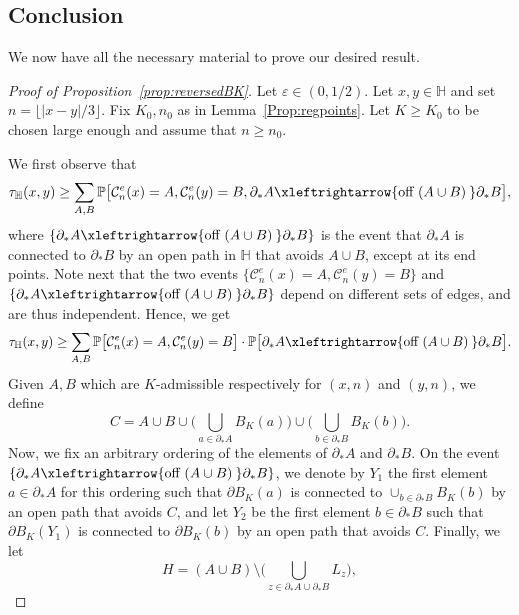 \documentclass[11pt,a4paper]{article}
\numberwithin{equation}{section}
\theoremstyle{plain}
\theoremstyle{definition}
\newcommand{\connect}{\xleftrightarrow}
\begin{document}
\subsection{Conclusion}\label{sec:conclusion}
We now have all the necessary material to prove our desired result. 

\begin{proof}[Proof of Proposition~\textup{\ref{prop:reversedBK}}] 
Let $\varepsilon\in (0,1/2)$. Let $x,y\in \mathbb H$ and set $n = \lfloor |x- y|/3\rfloor$. Fix $K_0,n_0$ as in Lemma~\ref{Prop:regpoints}. Let $K\geq K_0$ to be chosen large enough and assume that $n\ge n_0$.  

We first observe that 
\begin{equation}
	\tau_{\mathbb H}(x,y) \ge \sum_{A,B} \mathbb P\big[\mathcal C_n^e(x) = A, \mathcal C_n^e(y) = B, \partial_*A\connect{\textrm{off } (A\cup B)\:} \partial_*B\big],
\end{equation}
where $\{\partial_*A\connect{\textrm{off } (A\cup B)\:}\partial_*B\}$ is the event that $\partial_*A$ is connected to $\partial_*B$ by an open path in $\mathbb H$ that avoids $A\cup B$, except at its end points. Note next that the two events  
$\{\mathcal C_n^e(x) = A,\mathcal C_n^e(y) = B\}$ and $\{\partial_*A\connect{\textrm{off } (A\cup B)\:} \partial_*B\}$ depend on different sets of edges, and are thus independent. Hence, we get 
\begin{equation}  
\tau_{\mathbb H}(x,y) \ge \sum_{A,B} \mathbb P\big[\mathcal C_n^e(x) = A, \mathcal C_n^e(y) = B\big] \cdot \mathbb P\big[\partial_*A\connect{\textrm{off } (A\cup B)\:} \partial_*B\big]. 
\end{equation} 
Given $A,B$ which are $K$-admissible respectively for $(x,n)$ and $(y,n)$, we define 
\begin{equation} 
C= A\cup B \cup \big(\bigcup_{a\in \partial_*A} B_K(a)\big) \cup \big(\bigcup_{b\in \partial_*B} B_K(b)\big).
\end{equation}
Now, we fix an arbitrary ordering of the elements of $\partial_*A$ and $\partial_*B$. On the event $\{\partial_*A\connect{\textrm{off } (A\cup B)\:}\partial_*B\}$, we denote by $Y_1$ the first element $a\in \partial_*A$ for this ordering such that $\partial B_K(a)$ is connected to $\cup_{b\in \partial_*B} B_K(b)$ by an open path that avoids $C$, and let $Y_2$ be the first element $b\in \partial_*B$ such that $\partial B_K(Y_1)$ is connected to $\partial B_K(b)$ by an open path that avoids $C$. Finally, we let
\begin{equation} 
H = (A \cup B) \setminus \big(\bigcup_{z \in \partial_*A \cup \partial_*B} L_z\big),

\end{equation}
\end{proof}
\end{document}
